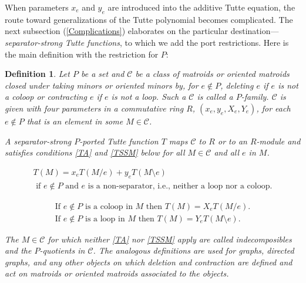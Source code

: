 \documentclass[12pt,leqno]{amsart}
\newtheorem{definition}[lem]{Definition}
\theoremstyle{remark}
\begin{document}
When parameters $x_e$ and $y_e$ are introduced into the 
additive Tutte equation, the route toward generalizations
of the Tutte polynomial becomes complicated.  The next subsection 
(\ref{Complications})
elaborates on the particular 
destination---\emph{separator-strong Tutte functions},
to which we add the port restrictions.
Here is the main definition with the
restriction for $P$:

\begin{definition}
Let $P$ be a set and $\mathcal{C}$ be a class of matroids or
oriented matroids closed under taking minors or oriented minors
by, for $e\not\in P$, deleting $e$ if $e$ is not a coloop or
contracting $e$ if $e$ is not a loop.
Such a $\mathcal{C}$ is called a $P$-family.  $\mathcal{C}$ is
given with four parameters in a commutative ring $R$,
$(x_e,y_e,X_e,Y_e)$, for each $e\not\in P$ that is an element
in some $M\in\mathcal{C}$.

A separator-strong $P$-ported Tutte function 
$T$ maps $\mathcal{C}$ to $R$ or to an $R$-module and satisfies 
conditions 
\eqref{TA} and \eqref{TSSM} below for all $M\in\mathcal{C}$ and
all $e$ in $M$.


\begin{equation}
\label{TA}
\tag{TA}
\begin{gathered}
T(M) = x_e T(M/e) + y_e T(M\setminus e) \\
\text{ if $e\not\in P$ and $e$ is a non-separator, 
       i.e., neither a loop nor a coloop.}
\end{gathered}
\end{equation}


\begin{equation}
\label{TSSM}
\tag{TSSM}
\begin{gathered}
\text{If } e\not\in P\text{ is a coloop in }M\text{ then }
T(M)=X_e T(M/e).\\
\text{If } e\not\in P\text{ is a loop in }M\text{ then }
T(M)=Y_e T(M\setminus e).
\end{gathered}
\end{equation}

The $M\in \mathcal{C}$ for which neither \eqref{TA} nor
\eqref{TSSM} apply are called \emph{indecomposibles} and
the \emph{$P$-quotients} in $\mathcal{C}$. The analogous
definitions are used for graphs, directed graphs,
and any other objects on which deletion and contraction are 
defined and act on matroids or oriented matroids associated
to the objects.

\end{definition}
\end{document}
